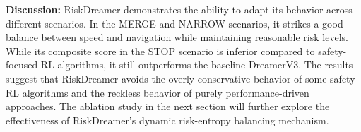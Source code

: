 \textbf{Discussion:}
RiskDreamer demonstrates the ability to adapt its behavior across different scenarios. In the MERGE and NARROW scenarios, it strikes a good balance between speed and navigation while maintaining reasonable risk levels. While its composite score in the STOP scenario is inferior compared to safety-focused RL algorithms, it still outperforms the baseline DreamerV3. The results suggest that RiskDreamer avoids the overly conservative behavior of some safety RL algorithms and the reckless behavior of purely performance-driven approaches. The ablation study in the next section will further explore the effectiveness of RiskDreamer's dynamic risk-entropy balancing mechanism.

